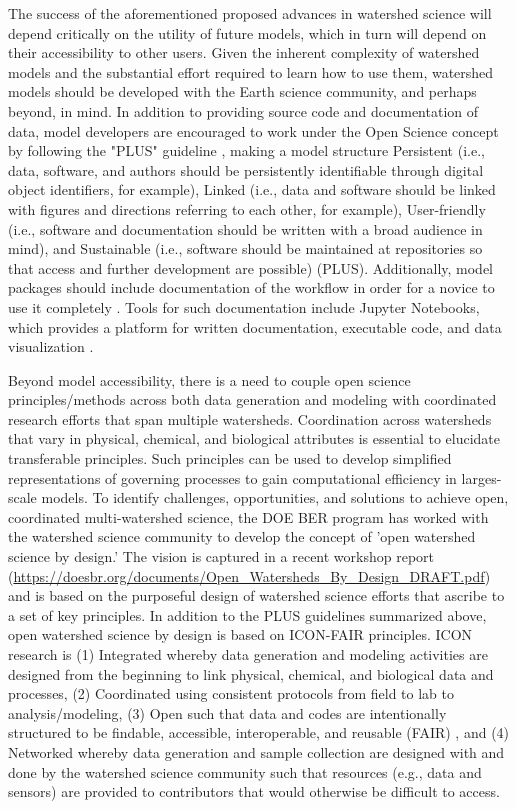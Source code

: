 \documentclass[preprint,review, 12pt]{elsarticle}
\begin{document}
The success of the aforementioned proposed advances in watershed science will depend critically on the utility of future models, which in turn will depend on their accessibility to other users. Given the inherent complexity of watershed models and the substantial effort required to learn how to use them, watershed models should be developed with the Earth science community, and perhaps beyond, in mind. In addition to providing source code and documentation of data, model developers are encouraged to work under the Open Science concept by following the "PLUS" guideline \citep{Yu2016}, making a model structure Persistent (i.e., data, software, and authors should be persistently identifiable through digital object identifiers, for example), Linked (i.e., data and software should be linked with figures and directions referring to each other, for example), User-friendly (i.e., software and documentation should be written with a broad audience in mind), and Sustainable (i.e., software should be maintained at repositories so that access and further development are possible) (PLUS). Additionally, model packages should include documentation of the workflow in order for a novice to use it completely \citep{Yu2016}. Tools for such documentation include Jupyter Notebooks, which provides a platform for written documentation, executable code, and data visualization \citep{Fienen2016, White2016}.

 Beyond model accessibility, there is a need to couple open science principles/methods across both data generation and modeling with coordinated research efforts that span multiple watersheds. Coordination across watersheds that vary in physical, chemical, and biological attributes is essential to elucidate transferable principles. Such principles can be used to develop simplified representations of governing processes to gain computational efficiency in larges-scale models. To identify challenges, opportunities, and solutions to achieve open, coordinated multi-watershed science, the DOE BER program has worked with the watershed science community to develop the concept of 'open watershed science by design.' The vision is captured in a recent workshop report (\url{https://doesbr.org/documents/Open_Watersheds_By_Design_DRAFT.pdf}) and is based on the purposeful design of watershed science efforts that ascribe to a set of key principles. In addition to the PLUS guidelines summarized above, open watershed science by design is based on ICON-FAIR principles. ICON research is (1) Integrated whereby data generation and modeling activities are designed from the beginning to link physical, chemical, and biological data and processes, (2) Coordinated using consistent protocols from field to lab to analysis/modeling, (3) Open such that data and codes are intentionally structured to be findable, accessible, interoperable, and reusable (FAIR) \citep{Wilkinson2016}, and (4) Networked whereby data generation and sample collection are designed with and done by the watershed science community such that resources (e.g., data and sensors) are provided to contributors that would otherwise be difficult to access. 
\end{document}
